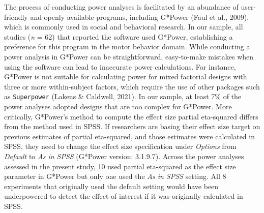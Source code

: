 \documentclass[
  man, donotrepeattitle,mask,floatsintext]{apa7}
\begin{document}
The process of conducting power analyses is facilitated by an abundance of user-friendly and openly available programs, including G*Power (Faul et al., 2009), which is commonly used in social and behavioral research. In our sample, all studies (\emph{n} = 62) that reported the software used G*Power, establishing a preference for this program in the motor behavior domain. While conducting a power analysis in G*Power can be straightforward, easy-to-make mistakes when using the software can lead to inaccurate power calculations. For instance, G*Power is not suitable for calculating power for mixed factorial designs with three or more within-subject factors, which require the use of other packages such as \texttt{Superpower} (Lakens \& Caldwell, 2021). In our sample, at least 7\% of the power analyses adopted designs that are too complex for G*Power. More critically, G*Power's method to compute the effect size partial eta-squared differs from the method used in SPSS. If researchers are basing their effect size target on previous estimates of partial eta-squared, and those estimates were calculated in SPSS, they need to change the effect size specification under \emph{Options} from \emph{Default} to \emph{As in SPSS} (G*Power version: 3.1.9.7). Across the power analyses assessed in the present study, 10 used partial eta-squared as the effect size parameter in G*Power but only one used the \emph{As in SPSS} setting. All 8 experiments that originally used the default setting would have been underpowered to detect the effect of interest if it was originally calculated in SPSS.
\end{document}
